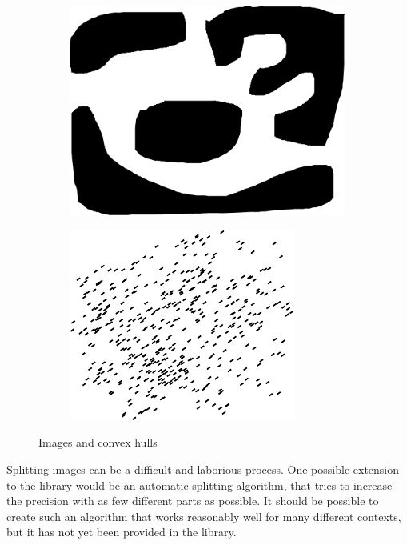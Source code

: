 \begin{figure}[p]
\begin{subfigure}[b]{0.3\linewidth}
	  \label{fig:image_ring}
	\end{subfigure}
	\centering
	\begin{subfigure}[b]{1.0\linewidth}
	  \centering
	  \includegraphics[scale=0.7]{convexhullimages/image_complex.pdf}
	  \label{fig:image_complex}
	\end{subfigure}
	\centering
	\begin{subfigure}[b]{0.3\linewidth}
	  \centering
	  \includegraphics[scale=0.5]{convexhullimages/image_cloud.pdf}
	  \label{fig:image_cloud}
	\end{subfigure}
\caption{Images and convex hulls}
\label{fig:convexhullimages}
\end{figure}

Splitting images can be a difficult and laborious process.
One possible extension to the library would be an automatic splitting algorithm,
that tries to increase the precision with as few different parts as possible.
It should be possible to create such an algorithm that works reasonably well
for many different contexts, but it has not yet been provided in the library.


